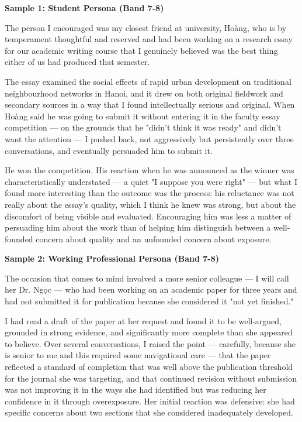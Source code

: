 \begin{ieltsanswer}
\textbf{Sample 1: Student Persona (Band 7-8)}

The person I encouraged was my closest friend at university, Hoàng, who is by temperament thoughtful and reserved and had been working on a research essay for our academic writing course that I genuinely believed was the best thing either of us had produced that semester.

The essay examined the social effects of rapid urban development on traditional neighbourhood networks in Hanoi, and it drew on both original fieldwork and secondary sources in a way that I found intellectually serious and original. When Hoàng said he was going to submit it without entering it in the faculty essay competition — on the grounds that he "didn't think it was ready" and didn't want the attention — I pushed back, not aggressively but persistently over three conversations, and eventually persuaded him to submit it.

He won the competition. His reaction when he was announced as the winner was characteristically understated — a quiet "I suppose you were right" — but what I found more interesting than the outcome was the process: his reluctance was not really about the essay's quality, which I think he knew was strong, but about the discomfort of being visible and evaluated. Encouraging him was less a matter of persuading him about the work than of helping him distinguish between a well-founded concern about quality and an unfounded concern about exposure.

\textbf{Sample 2: Working Professional Persona (Band 7-8)}

The occasion that comes to mind involved a more senior colleague — I will call her Dr. Ngọc — who had been working on an academic paper for three years and had not submitted it for publication because she considered it "not yet finished."

I had read a draft of the paper at her request and found it to be well-argued, grounded in strong evidence, and significantly more complete than she appeared to believe. Over several conversations, I raised the point — carefully, because she is senior to me and this required some navigational care — that the paper reflected a standard of completion that was well above the publication threshold for the journal she was targeting, and that continued revision without submission was not improving it in the ways she had identified but was reducing her confidence in it through overexposure. Her initial reaction was defensive: she had specific concerns about two sections that she considered inadequately developed.


\end{ieltsanswer}

